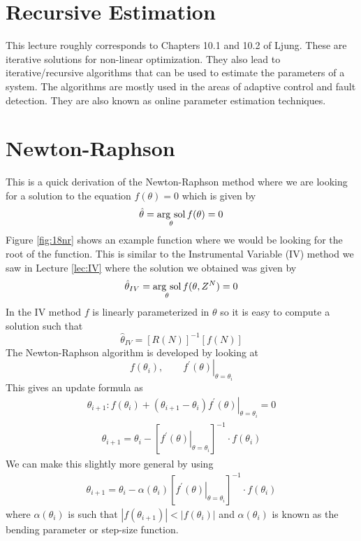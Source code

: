 
\mainmatter
\setcounter{page}{1}

\lectureseries[\course]{\course}

\date{December 1, 2009}

\setaddress

\setcounter{lecture}{17}
\setcounter{chapter}{17}


\section{Recursive Estimation}
This lecture roughly corresponds to Chapters 10.1 and 10.2 of Ljung. These are iterative solutions for non-linear optimization. They also lead to iterative/recursive algorithms that can be used to estimate the parameters of a system. The algorithms are mostly used in the areas of adaptive control and fault detection. They are also known as online parameter estimation techniques.

\section{Newton-Raphson}
This is a quick derivation of the Newton-Raphson method where we are looking for a solution to the equation $f(\theta)=0$ which is given by
$$\hat{\theta} = \mathop{\arg\,\text{sol}}\limits_\theta f(\theta) = 0$$
Figure \ref{fig:18nr} shows an example function where we would be looking for the root of the function. This is similar to the Instrumental Variable (IV) method we saw in Lecture \ref{lec:IV} where the solution we obtained was given by
$$\hat{\theta}_{IV} = \mathop{\arg\,\text{sol}}\limits_\theta f(\theta,Z^N) = 0$$
In the IV method $f$ is linearly parameterized in $\theta$ so it is easy to compute a solution such that
$$\hat{\theta}_{IV} = [R(N)]^{-1}[f(N)]$$
The Newton-Raphson algorithm is developed by looking at
$$f(\theta_i), \qquad \left.f^\prime(\theta)\right|_{\theta=\theta_i}$$
This gives an update formula as
\begin{align*}
\theta_{i+1}: f(\theta_i) + (\theta_{i+1}-\theta_i)\left.f^\prime(\theta)\right|_{\theta=\theta_i} = 0
\end{align*}
\begin{align*}
\boxed{\theta_{i+1} = \theta_i - \left[\left.f^\prime(\theta)\right|_{\theta=\theta_i}\right]^{-1}\cdot f(\theta_i)}
\end{align*}
We can make this slightly more general by using
\begin{align*}
\boxed{\theta_{i+1} = \theta_i - \alpha(\theta_i)\left[\left.f^\prime(\theta)\right|_{\theta=\theta_i}\right]^{-1}\cdot f(\theta_i)}
\end{align*}
where $\alpha(\theta_i)$ is such that $|f(\theta_{i+1})|<|f(\theta_i)|$ and $\alpha(\theta_i)$ is known as the bending parameter or step-size function.

